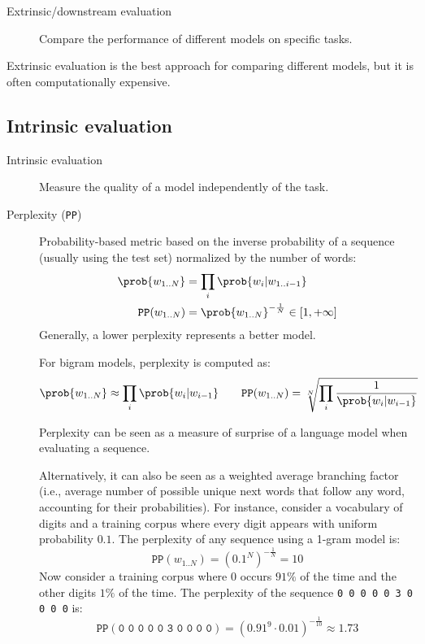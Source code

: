 \begin{description}
    \item[Extrinsic/downstream evaluation] 
        Compare the performance of different models on specific tasks.
\end{description}

\begin{remark}
    Extrinsic evaluation is the best approach for comparing different models, but it is often computationally expensive.
\end{remark}


\subsection{Intrinsic evaluation}

\begin{description}
    \item[Intrinsic evaluation] 
        Measure the quality of a model independently of the task.

    \item[Perplexity (\texttt{PP})] 
        Probability-based metric based on the inverse probability of a sequence (usually using the test set) normalized by the number of words:
        \[
            \begin{split}
                \prob{w_{1..N}} &= \prod_{i} \prob{w_i | w_{1..i-1}} \\
                \texttt{PP}(w_{1..N}) &= \prob{w_{1..N}}^{-\frac{1}{N}} \in [1, +\infty]
            \end{split}
        \]
        Generally, a lower perplexity represents a better model.

        \begin{example}
            For bigram models, perplexity is computed as:
            \[ 
                \prob{w_{1..N}} \approx \prod_{i} \prob{w_i | w_{i-1}}
                \qquad
                \texttt{PP}(w_{1..N}) = \sqrt[N]{\prod_{i} \frac{1}{\prob{w_i | w_{i-1}}}}
            \]
        \end{example}

        \begin{remark}
            Perplexity can be seen as a measure of surprise of a language model when evaluating a sequence.

            Alternatively, it can also be seen as a weighted average branching factor (i.e., average number of possible unique next words that follow any word, accounting for their probabilities). For instance, consider a vocabulary of digits and a training corpus where every digit appears with uniform probability $0.1$. The perplexity of any sequence using a 1-gram model is:
            \[ \texttt{PP}(w_{1..N}) = \left( 0.1^{N} \right)^{-\frac{1}{N}} = 10 \]
            Now consider a training corpus where $0$ occurs $91\%$ of the time and the other digits $1\%$ of the time. The perplexity of the sequence \texttt{0 0 0 0 0 3 0 0 0 0} is:
            \[ \texttt{PP}(\texttt{0 0 0 0 0 3 0 0 0 0}) = \left( 0.91^9 \cdot 0.01 \right)^{-\frac{1}{10}} \approx 1.73 \]
        \end{remark}


\end{description}
